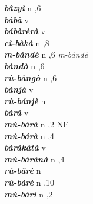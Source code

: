 \begin{multicols}{2}
{{\bfseries\itshape bâzyì}} \relax  n  ,6  \relax   \relax  \\
{{\bfseries\itshape bâbà}} \relax  v  \relax   \relax  {} \relax   \relax  \\
{{\bfseries\itshape bábàrèrà}} \relax  v  \relax   \relax  {} \relax   \relax  \\
{{\bfseries\itshape cì-bàkà}} \relax  n  ,8  \relax   \relax  \\
{{\bfseries\itshape m-bàndè}} \relax  n  ,6  \relax  \textit{m-bàndè} \relax  \\
{{\bfseries\itshape bàndò}} \relax  n  ,6  \relax   \relax  \\
{{\bfseries\itshape rù-bàngò}} \relax  n  ,6  \relax   \relax  \\
{{\bfseries\itshape bànjà}} \relax  v  \relax   \relax  {} \relax   \relax  \\
{{\bfseries\itshape rù-bánjè}} \relax  n   \relax  {} \relax   \relax  \\
{{\bfseries\itshape bàrà}} \relax  v  \relax   \relax  {} \relax   \relax  \\
{{\bfseries\itshape mù-bàrà}} \relax  n  ,2  \relax  NF \relax  \\
{{\bfseries\itshape mù-bárà}} \relax  n  ,4  \relax   \relax  \\
{{\bfseries\itshape bàràkàtà}} \relax  v  \relax  {} \relax   \relax  \\
{{\bfseries\itshape mù-bàránà}} \relax  n  ,4  \relax   \relax  \\
{{\bfseries\itshape rù-bârè}} \relax  n   \relax  {} \relax   \relax  \\
{{\bfseries\itshape rù-bàrè}} \relax  n  ,10  \relax   \relax  \\
{{\bfseries\itshape mù-bàrì}} \relax  n  ,2  \relax   \relax  \\

\end{multicols}
